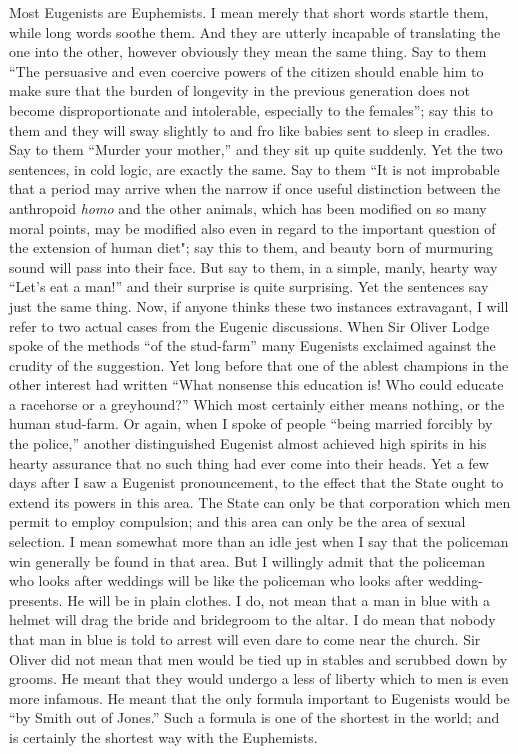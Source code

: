 \documentclass{book}
\begin{document}
Most Eugenists are Euphemists. I mean merely that short words startle them, while long words soothe them. And they are utterly incapable of translating the one into the other, however obviously they mean the same thing. Say to them “The persuasive and even coercive powers of the citizen should enable him to make sure that the burden of longevity in the previous generation does not become disproportionate and intolerable, especially to the females”; say this to them and they will sway slightly to and fro like babies sent to sleep in cradles. Say to them “Murder your mother,” and they sit up quite suddenly. Yet the two sentences, in cold logic, are exactly the same. Say to them “It is not improbable that a period may arrive when the narrow if once useful distinction between the anthropoid \emph{homo} and the other animals, which has been modified on so many moral points, may be modified also even in regard to the important question of the extension of human diet"; say this to them, and beauty born of murmuring sound will pass into their face. But say to them, in a simple, manly, hearty way “Let’s eat a man!” and their surprise is quite surprising. Yet the sentences say just the same thing. Now, if anyone thinks these two instances extravagant, I will refer to two actual cases from the Eugenic discussions. When Sir Oliver Lodge spoke of the methods “of the stud-farm” many Eugenists exclaimed against the crudity of the suggestion. Yet long before that one of the ablest champions in the other interest had written “What nonsense this education is! Who could educate a racehorse or a greyhound?” Which most certainly either means nothing, or the human stud-farm. Or again, when I spoke of people “being married forcibly by the police,” another distinguished Eugenist almost achieved high spirits in his hearty assurance that no such thing had ever come into their heads. Yet a few days after I saw a Eugenist pronouncement, to the effect that the State ought to extend its powers in this area. The State can only be that corporation which men permit to employ compulsion; and this area can only be the area of sexual selection. I mean somewhat more than an idle jest when I say that the policeman win generally be found in that area. But I willingly admit that the policeman who looks after weddings will be like the policeman who looks after wedding-presents. He will be in plain clothes. I do, not mean that a man in blue with a helmet will drag the bride and bridegroom to the altar. I do mean that nobody that man in blue is told to arrest will even dare to come near the church. Sir Oliver did not mean that men would be tied up in stables and scrubbed down by grooms. He meant that they would undergo a less of liberty which to men is even more infamous. He meant that the only formula important to Eugenists would be “by Smith out of Jones.” Such a formula is one of the shortest in the world; and is certainly the shortest way with the Euphemists.
\end{document}
